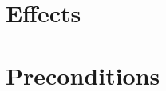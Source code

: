 \documentclass[master.tex]{subfiles}
\begin{document}
\section{Effects}


\section{Preconditions}

\end{document}

